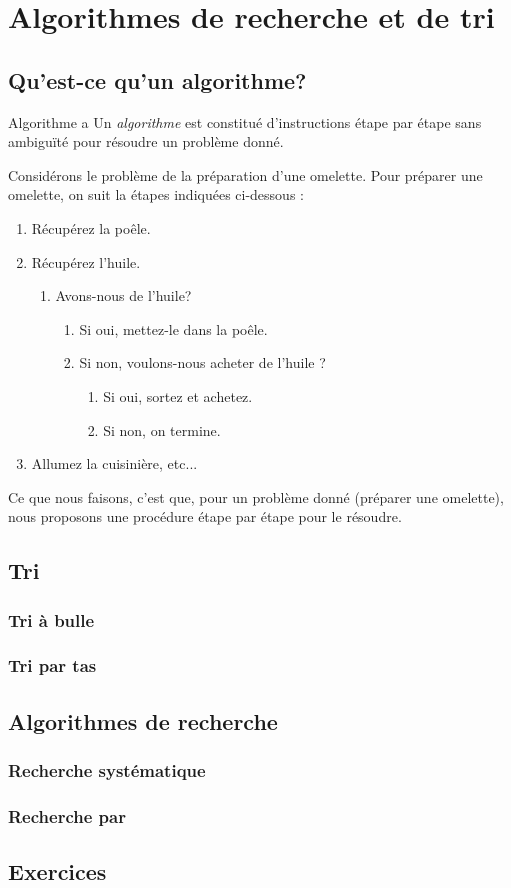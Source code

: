 \chapter{Algorithmes de recherche et de tri}
\section{Qu’est-ce qu’un algorithme?}
\begin{definition}{Algorithme} a
	Un \emph{algorithme} est constitué d’instructions étape par étape sans ambiguïté pour résoudre un problème donné.
\end{definition}
\begin{example}
	Considérons le problème de la préparation d'une omelette. Pour préparer une omelette, on suit la
	étapes indiquées ci-dessous :
	\begin{enumerate}
		\item Récupérez la poêle.
		\item  Récupérez l'huile.
		
		\begin{enumerate}
			\item Avons-nous de l'huile?
	 \begin{enumerate}
	 	\item Si oui, mettez-le dans la poêle.
	 \item  Si non, voulons-nous acheter de l'huile ?
	 \begin{enumerate}
	 	\item Si oui, sortez et achetez.
	 	\item Si non, on termine.
	 
	 \end{enumerate}
		\end{enumerate}
	 \end{enumerate}
		\item Allumez la cuisinière, etc...
	\end{enumerate}
	Ce que nous faisons, c'est que, pour un problème donné (préparer une omelette), nous proposons une procédure étape par étape pour le résoudre.
\end{example}
\section{Tri}
\subsection{Tri \`a bulle}
\subsection{Tri par tas}

\section{Algorithmes de recherche}
\subsection{Recherche syst\'ematique}
\subsection{Recherche par }

\section{Exercices}

